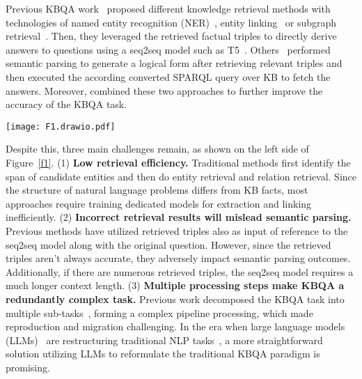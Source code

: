 \documentclass{article} \usepackage{iclr2024_conference,times}
\begin{document}
Previous KBQA work~\citep{SR,UniK-QA,StructGPT} proposed different knowledge retrieval methods with technologies of named entity recognition (NER)~\citep{BERT}, entity linking~\citep{ELQ} or subgraph retrieval~\citep{SR}. Then, they leveraged the retrieved factual triples to directly derive answers to questions using a seq2seq model such as T5~\citep{T5}. Others~\citep{RnG-KBQA,GMT-KBQA,TIARA} performed semantic parsing to generate a logical form after retrieving relevant triples and then executed the according converted SPARQL query over KB to fetch the answers. Moreover, \citet{DECAF} combined these two approaches to further improve the accuracy of the KBQA task.

\begin{figure*}[h!t]
\centering
\texttt{[image: F1.drawio.pdf]}
\caption{Comparison of examples of previous retrieve-then-generate KBQA framework (left) and our proposed generate-then-retrieve KBQA framework, ChatKBQA (right). Note that labels such as ``\texttt{g.g.a}" etc. in the computational graph are acronyms for relation names such as ``\texttt{government.government\_position\_held.appointed\_by}". }
\label{f1}
\vspace{-3mm}
\end{figure*}

Despite this, three main challenges remain, as shown on the left side of Figure~\ref{f1}. (1) \textbf{Low retrieval efficiency.} Traditional methods first identify the span of candidate entities and then do entity retrieval and relation retrieval. Since the structure of natural language problems differs from KB facts, most approaches require training dedicated models for extraction and linking inefficiently. (2) \textbf{Incorrect retrieval results will mislead semantic parsing.} Previous methods have utilized retrieved triples also as input of reference to the seq2seq model along with the original question. However, since the retrieved triples aren't always accurate, they adversely impact semantic parsing outcomes. Additionally, if there are numerous retrieved triples, the seq2seq model requires a much longer context length. (3) \textbf{Multiple processing steps make KBQA a redundantly complex task.} Previous work decomposed the KBQA task into multiple sub-tasks~\citep{GMT-KBQA,TIARA}, forming a complex pipeline processing, which made reproduction and migration challenging. In the era when large language models (LLMs)~\citep{GPT4,LLMsurvey,LLMKGsurvey} are restructuring traditional NLP tasks~\citep{Flan-T5,gptner,InstructUIE}, a more straightforward solution utilizing LLMs to reformulate the traditional KBQA paradigm is promising.
\end{document}
